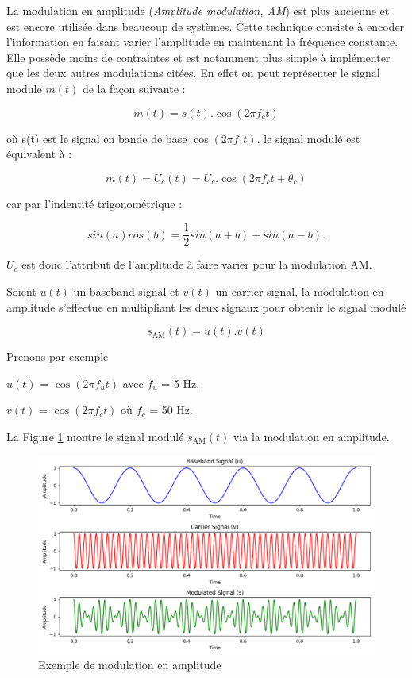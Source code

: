 La modulation en amplitude (\textit{Amplitude modulation, AM}) est plus ancienne et est encore utilisée dans beaucoup de systèmes. Cette technique consiste à encoder l'information en faisant varier l'amplitude en maintenant la fréquence constante. Elle possède moins de contraintes et est notamment plus simple à implémenter que les deux autres modulations citées. En effet on peut représenter le signal modulé $m(t)$ de la façon suivante :

\begin{equation}\label{eq112}
m(t) = s(t) . \cos(2 \pi f_c t)
\end{equation}

où s(t) est le signal en bande de base $\cos(2 \pi f_1 t)$. le signal modulé est équivalent à :

\begin{equation}\label{eq113}
m(t) = U_c(t) = U_c . \cos(2 \pi f_c t + \theta_c)
\end{equation}

car par l'indentité trigonométrique :

\begin{equation}\label{eq114}
sin(a)cos(b) = \frac{1}{2} sin(a+b) + sin(a-b).
\end{equation}

$U_c$ est donc l'attribut de l'amplitude à faire varier pour la modulation AM.

\vspace{0.1cm}

Soient $u(t)$ un baseband signal et $v(t)$ un carrier signal, la modulation en amplitude s'effectue en multipliant les deux signaux pour obtenir le signal modulé 

\begin{equation}\label{eq2}
s_\mathrm{AM}(t) = u(t) . v(t)
\end{equation}

Prenons par exemple 

$u(t)$ = $\cos(2\pi f_{u}t)$ avec $f_{u}$ = 5 Hz,

$v(t)$ = $\cos(2\pi f_{c}t)$ où $f_{c}$ = 50 Hz.

La Figure \ref{term1} montre le signal modulé $s_\mathrm{AM}(t)$ via la modulation en amplitude.


\begin{figure}[h]
\centering

\includegraphics[scale=0.5]{images/AM_mod.PNG}
\caption{Exemple de modulation en amplitude}\label{term1}
\end{figure}

